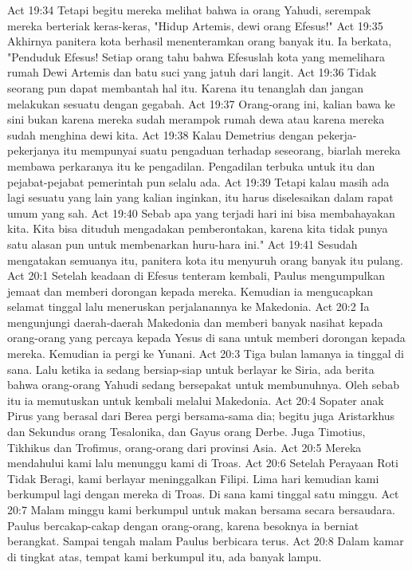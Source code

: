 Act 19:34  Tetapi begitu mereka melihat bahwa ia orang Yahudi, serempak mereka berteriak keras-keras, "Hidup Artemis, dewi orang Efesus!"
Act 19:35  Akhirnya panitera kota berhasil menenteramkan orang banyak itu. Ia berkata, "Penduduk Efesus! Setiap orang tahu bahwa Efesuslah kota yang memelihara rumah Dewi Artemis dan batu suci yang jatuh dari langit.
Act 19:36  Tidak seorang pun dapat membantah hal itu. Karena itu tenanglah dan jangan melakukan sesuatu dengan gegabah.
Act 19:37  Orang-orang ini, kalian bawa ke sini bukan karena mereka sudah merampok rumah dewa atau karena mereka sudah menghina dewi kita.
Act 19:38  Kalau Demetrius dengan pekerja-pekerjanya itu mempunyai suatu pengaduan terhadap seseorang, biarlah mereka membawa perkaranya itu ke pengadilan. Pengadilan terbuka untuk itu dan pejabat-pejabat pemerintah pun selalu ada.
Act 19:39  Tetapi kalau masih ada lagi sesuatu yang lain yang kalian inginkan, itu harus diselesaikan dalam rapat umum yang sah.
Act 19:40  Sebab apa yang terjadi hari ini bisa membahayakan kita. Kita bisa dituduh mengadakan pemberontakan, karena kita tidak punya satu alasan pun untuk membenarkan huru-hara ini."
Act 19:41  Sesudah mengatakan semuanya itu, panitera kota itu menyuruh orang banyak itu pulang.
Act 20:1  Setelah keadaan di Efesus tenteram kembali, Paulus mengumpulkan jemaat dan memberi dorongan kepada mereka. Kemudian ia mengucapkan selamat tinggal lalu meneruskan perjalanannya ke Makedonia.
Act 20:2  Ia mengunjungi daerah-daerah Makedonia dan memberi banyak nasihat kepada orang-orang yang percaya kepada Yesus di sana untuk memberi dorongan kepada mereka. Kemudian ia pergi ke Yunani.
Act 20:3  Tiga bulan lamanya ia tinggal di sana. Lalu ketika ia sedang bersiap-siap untuk berlayar ke Siria, ada berita bahwa orang-orang Yahudi sedang bersepakat untuk membunuhnya. Oleh sebab itu ia memutuskan untuk kembali melalui Makedonia.
Act 20:4  Sopater anak Pirus yang berasal dari Berea pergi bersama-sama dia; begitu juga Aristarkhus dan Sekundus orang Tesalonika, dan Gayus orang Derbe. Juga Timotius, Tikhikus dan Trofimus, orang-orang dari provinsi Asia.
Act 20:5  Mereka mendahului kami lalu menunggu kami di Troas.
Act 20:6  Setelah Perayaan Roti Tidak Beragi, kami berlayar meninggalkan Filipi. Lima hari kemudian kami berkumpul lagi dengan mereka di Troas. Di sana kami tinggal satu minggu.
Act 20:7  Malam minggu kami berkumpul untuk makan bersama secara bersaudara. Paulus bercakap-cakap dengan orang-orang, karena besoknya ia berniat berangkat. Sampai tengah malam Paulus berbicara terus.
Act 20:8  Dalam kamar di tingkat atas, tempat kami berkumpul itu, ada banyak lampu.
